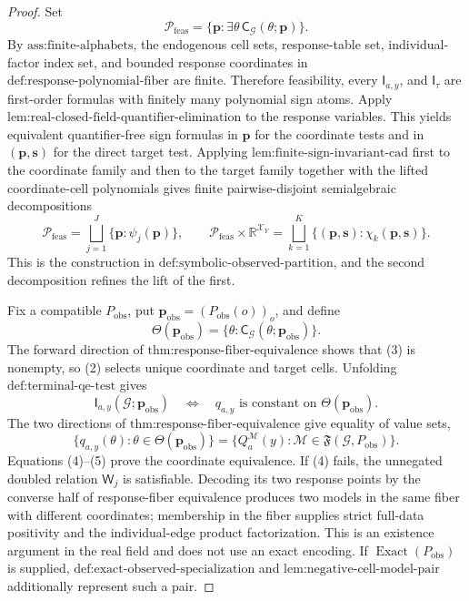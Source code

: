 \documentclass{article}
\begin{document}
\begin{proof}
Set
\[
\mathcal P_{\mathrm{feas}}
=\{\mathbf p:\exists\theta\,\mathsf C_{\mathcal G}(\theta;\mathbf p)\}.
\tag{1}
\]
By \(\text{ass:finite-alphabets}\), the endogenous cell sets, response-table set, individual-factor index set, and bounded response coordinates in \(\text{def:response-polynomial-fiber}\) are finite.  Therefore feasibility, every \(\mathsf I_{a,y}\), and \(\mathsf I_\tau\) are first-order formulas with finitely many polynomial sign atoms.  Apply \(\text{lem:real-closed-field-quantifier-elimination}\) to the response variables.  This yields equivalent quantifier-free sign formulas in \(\mathbf p\) for the coordinate tests and in \((\mathbf p,\mathbf s)\) for the direct target test.  Applying \(\text{lem:finite-sign-invariant-cad}\) first to the coordinate family and then to the target family together with the lifted coordinate-cell polynomials gives finite pairwise-disjoint semialgebraic decompositions
\[
\mathcal P_{\mathrm{feas}}
=\bigsqcup_{j=1}^{J}\{\mathbf p:\psi_j(\mathbf p)\},
\qquad
\mathcal P_{\mathrm{feas}}\times\mathbb R^{\mathcal X_Y}
=\bigsqcup_{k=1}^{K}\{(\mathbf p,\mathbf s):\chi_k(\mathbf p,\mathbf s)\}.
\tag{2}
\]
This is the construction in \(\text{def:symbolic-observed-partition}\), and the second decomposition refines the lift of the first.

Fix a compatible \(P_{\mathrm{obs}}\), put \(\mathbf p_{\mathrm{obs}}=(P_{\mathrm{obs}}(o))_o\), and define
\[
\Theta(\mathbf p_{\mathrm{obs}})
=\{\theta:\mathsf C_{\mathcal G}(\theta;\mathbf p_{\mathrm{obs}})\}.
\tag{3}
\]
The forward direction of \(\text{thm:response-fiber-equivalence}\) shows that (3) is nonempty, so (2) selects unique coordinate and target cells.  Unfolding \(\text{def:terminal-qe-test}\) gives
\[
\mathsf I_{a,y}(\mathcal G;\mathbf p_{\mathrm{obs}})
\quad\Longleftrightarrow\quad
q_{a,y}\text{ is constant on }\Theta(\mathbf p_{\mathrm{obs}}).
\tag{4}
\]
The two directions of \(\text{thm:response-fiber-equivalence}\) give equality of value sets,
\[
\{q_{a,y}(\theta):\theta\in\Theta(\mathbf p_{\mathrm{obs}})\}
=\{Q_a^{\mathcal M}(y):\mathcal M\in\mathfrak F(\mathcal G,P_{\mathrm{obs}})\}.
\tag{5}
\]
Equations (4)--(5) prove the coordinate equivalence.  If (4) fails, the unnegated doubled relation \(\mathsf W_j\) is satisfiable.  Decoding its two response points by the converse half of response-fiber equivalence produces two models in the same fiber with different coordinates; membership in the fiber supplies strict full-data positivity and the individual-edge product factorization.  This is an existence argument in the real field and does not use an exact encoding.  If \(\operatorname{Exact}(P_{\mathrm{obs}})\) is supplied, \(\text{def:exact-observed-specialization}\) and \(\text{lem:negative-cell-model-pair}\) additionally represent such a pair.


\end{proof}
\end{document}
